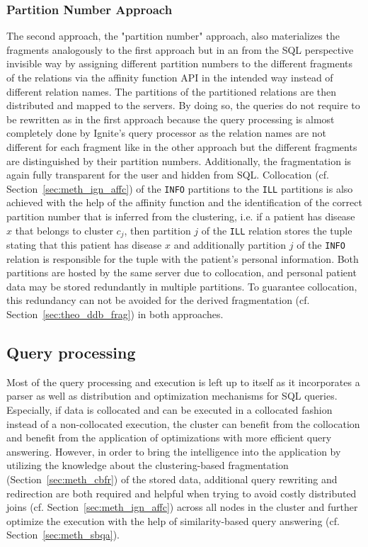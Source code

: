 \subsubsection{Partition Number Approach}
\label{sec:impl_alter_partnum}

The second approach, the "partition number" approach, also materializes the fragments analogously to the first approach but in an from the SQL perspective
invisible way by assigning different partition numbers to the different fragments of the relations via the affinity function API in the intended way instead of
different relation names. The partitions of the partitioned relations are then distributed and mapped to the servers. By doing so, the queries do not require to
be rewritten as in the first approach because the query processing is almost completely done by Ignite's query processor as the relation names are not different
for each fragment like in the other approach but the different fragments are distinguished by their partition numbers. Additionally, the fragmentation is again
fully transparent for the user and hidden from SQL. Collocation (cf. Section~\ref{sec:meth_ign_affc}) of the \verb!INFO! partitions to the \verb!ILL! partitions 
is also achieved with the help of the affinity function and the identification of the correct partition number that is inferred from the clustering, i.e. if a
patient has disease $x$ that belongs to cluster $c_j$, then partition $j$ of the \verb!ILL! relation stores the tuple stating that this patient has disease $x$ 
and additionally partition $j$ of the \verb!INFO! relation is responsible for the tuple with the patient's personal information. Both partitions are hosted by 
the same server due to collocation, and personal patient data may be stored redundantly in multiple partitions. To guarantee collocation, this redundancy can 
not be avoided for the derived fragmentation (cf. Section~\ref{sec:theo_ddb_frag}) in both approaches.



\subsection{Query processing}
\label{sec:impl_qpro}

Most of the query processing and execution is left up to  itself as it incorporates a parser as well as distribution and optimization
mechanisms for SQL queries. Especially, if data is collocated and can be executed in a collocated fashion instead of a non-collocated execution, the cluster 
can benefit from the collocation and benefit from the application of optimizations with more efficient query answering. However, in order to bring the
intelligence into the application by utilizing the knowledge about the clustering-based fragmentation (Section~\ref{sec:meth_cbfr}) of the stored data, 
additional query rewriting and redirection are both required and helpful when trying to avoid costly distributed joins (cf. Section~\ref{sec:meth_ign_affc})
across all nodes in the cluster and further optimize the execution with the help of similarity-based query answering (cf. Section~\ref{sec:meth_sbqa}).

